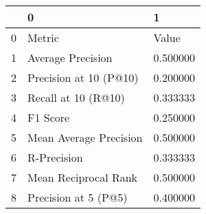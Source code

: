 \begin{tabular}{lll}
\toprule
 & 0 & 1 \\
\midrule
0 & Metric & Value \\
1 & Average Precision & 0.500000 \\
2 & Precision at 10 (P@10) & 0.200000 \\
3 & Recall at 10 (R@10) & 0.333333 \\
4 & F1 Score & 0.250000 \\
5 & Mean Average Precision & 0.500000 \\
6 & R-Precision & 0.333333 \\
7 & Mean Reciprocal Rank & 0.500000 \\
8 & Precision at 5 (P@5) & 0.400000 \\
\bottomrule
\end{tabular}
